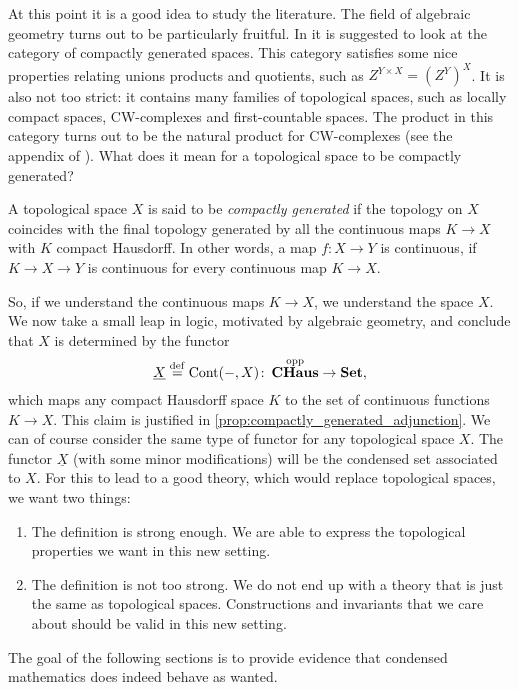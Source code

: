 \documentclass{article}
\DeclareMathOperator{\opp}{opp}
\DeclareMathOperator{\Cont}{Cont}
\DeclareMathOperator{\CHaus}{\mathbf{CHaus}}
\begin{document}
At this point it is a good idea to study the literature.
The field of algebraic geometry turns out to be particularly
fruitful. In \cite{Steenrod1967ConvenientCT} it is suggested
to look at the category of compactly generated
spaces. This category satisfies some nice properties
relating unions products and quotients, such as $Z^{Y\times X} = (Z^Y)^X$.
It is also not too strict: it contains
many families of topological spaces, such as locally compact
spaces, CW-complexes and first-countable spaces. The product in this
category turns out to be the natural product for CW-complexes
(see the appendix of \cite{Hat2002AlgebraicT}).
What does it mean for a topological space to be compactly generated?
\begin{definition}
    A topological space $X$ is said to be \emph{compactly generated}
    if the topology on $X$ coincides with the final topology generated
    by all the continuous maps $K \to X$ with $K$ compact Hausdorff.
    In other words, a map $f\colon X \to Y$ is continuous, if
    $K \to X \to Y$ is continuous for every continuous map $K \to X$.
\end{definition}
So, if we understand the continuous maps $K \to X$, we understand
the space $X$. We now take a small leap in logic, motivated by algebraic
geometry, and conclude that $X$ is determined by the functor
\begin{equation*}
    \underline{X} \defeq \Cont(-, X) \colon \CHaus^{\opp} \to \Set,
\end{equation*}
which maps any compact Hausdorff space $K$ to the set of
continuous functions $K \to X$. This claim is justified in
\cref{prop:compactly_generated_adjunction}. We can of course
consider the same type of functor for any topological space
$X$. The functor $\underline{X}$ (with some minor modifications)
will be the condensed set
associated to $X$. For this to lead to a good theory, which
would replace topological spaces, we want two things:
\begin{enumerate}
    \item The definition is strong enough. We are able
          to express the topological properties we want in this
          new setting.
    \item The definition is not too strong. We do not
          end up with a theory that is just the same as topological spaces.
          Constructions and invariants that we care about should be
          valid in this new setting.
\end{enumerate}
The goal of the following sections is to provide evidence
that condensed mathematics does indeed behave as wanted.
\end{document}
